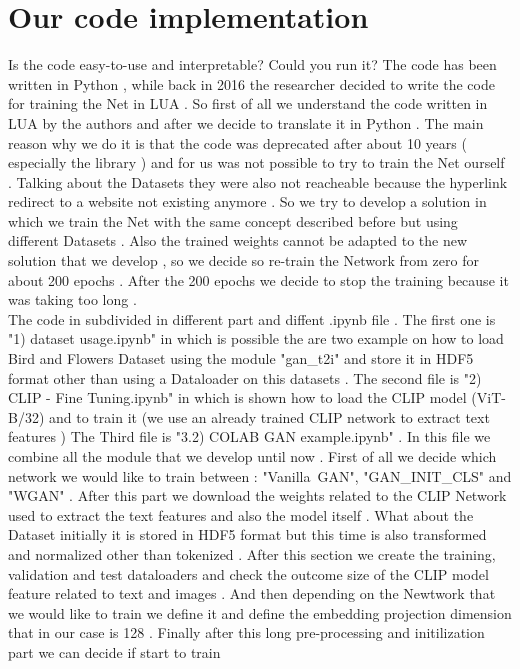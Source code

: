 
\section*{Our code implementation }
Is the code easy-to-use and interpretable? Could you run it?
The code has been written in Python , while back in 2016 the researcher 
decided to write the code for training the Net in LUA .
So first of all we understand the code written in LUA by the authors and 
after we decide to translate it in Python . 
The main reason why we do it is that the code was deprecated after about 10 years (
especially the library ) and for us was not possible to try to train the Net 
ourself . 
Talking about the Datasets they were also not reacheable because the hyperlink redirect 
to a website not existing anymore .
So we try to develop a solution in which we train the Net with the same concept described 
before but using different Datasets .  
Also the trained weights cannot be adapted to the new solution that we develop ,
so we decide so re-train the Network from zero for about 200 epochs .
After the 200 epochs we decide to stop the training because it was taking too long .
\\
The code in subdivided in different part and diffent .ipynb file .
The first one is "1) dataset usage.ipynb" in which is possible the are two example 
on how to load Bird and Flowers Dataset using the module "gan\_t2i" and store it in HDF5 format 
other than using a Dataloader on this datasets .
The second file is "2) CLIP - Fine Tuning.ipynb" in which is shown how to load the CLIP model 
(ViT-B/32) and to train it (we use an already trained CLIP network to extract text features )
The Third file is "3.2) COLAB GAN example.ipynb" . In this file we combine all the 
module that we develop until now . 
First of all we decide which network we would like to train between : "Vanilla\ GAN", "GAN\_INIT\_CLS" 
and "WGAN" . 
After this part we download the weights related to the CLIP Network used to extract 
the text features and also the model itself .
What about the Dataset initially it is stored in HDF5 format but this time is also 
transformed and normalized other than tokenized .
After this section we create the training, validation and test dataloaders and check the 
outcome size of the CLIP model feature related to text and images .
And then depending on the Newtwork that we would like to train 
we define it and define the embedding projection dimension that in our case is 128 .
Finally after this long pre-processing and initilization part we can decide if start to train

